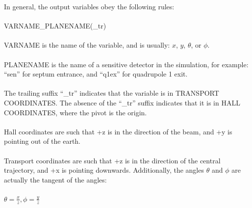 \documentclass[11pt]{amsart}
\begin{document}
In general, the output variables obey the following rules:\\
\\
VARNAME\_PLANENAME(\_tr)\\
\\
VARNAME is the name of the variable, and is usually: $x$, $y$, $\theta$, or $\phi$.\\
\\
PLANENAME is the name of a sensitive detector in the simulation, for example: ``sen'' for septum entrance, and ``q1ex'' for quadrupole 1 exit.\\
\\
The trailing suffix ``\_tr'' indicates that the variable is in TRANSPORT COORDINATES. The absence of the ``\_tr'' suffix indicates that it is in HALL COORDINATES, where the pivot is the origin.\\
\\
Hall coordinates are such that +z is in the direction of the beam, and +y is pointing out of the earth.\\
\\
Transport coordinates are such that +z is in the direction of the central trajectory, and +x is pointing downwards. Additionally, the angles $\theta$ and $\phi$ are actually the tangent of the angles:  \\
\\
$\theta = \frac{x}{z}, \phi = \frac{y}{z}$\\
\\
\end{document}
